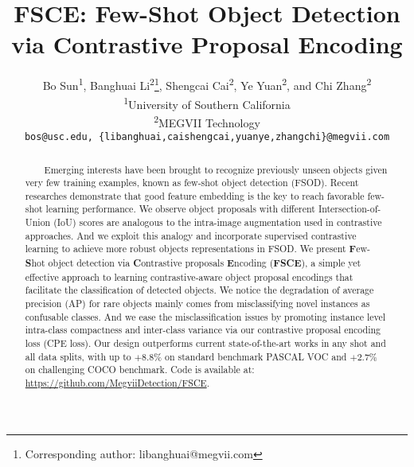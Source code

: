 \documentclass[final]{cvpr}
\newcommand*{\affaddr}[1]{#1} \newcommand*{\affmark}[1][*]{\textsuperscript{#1}}
\newcommand*{\email}[1]{\texttt{#1}}
\begin{document}
\title{FSCE: Few-Shot Object Detection via Contrastive Proposal Encoding}

\author{Bo Sun\affmark[1], Banghuai Li\affmark[2]\thanks{Corresponding author: libanghuai@megvii.com}, Shengcai Cai\affmark[2], Ye Yuan\affmark[2], and Chi Zhang\affmark[2]\\
\affaddr{\affmark[1]University of Southern California}\\
\affaddr{\affmark[2]MEGVII Technology}\\
\email{bos@usc.edu, \{libanghuai,caishengcai,yuanye,zhangchi\}@megvii.com}\\
}

\maketitle

\begin{abstract}
\vspace{-2.5mm}
\ \ \ \ Emerging interests have been brought to recognize previously unseen objects given very few training examples, known as few-shot object detection (FSOD). Recent researches demonstrate that good feature embedding is the key to reach favorable few-shot learning performance.  We observe object proposals with different Intersection-of-Union (IoU) scores are analogous to the intra-image augmentation used in contrastive approaches. And we exploit this analogy and incorporate supervised contrastive learning to achieve more robust objects representations in FSOD. We present \textbf{F}ew-\textbf{S}hot object detection via \textbf{C}ontrastive proposals \textbf{E}ncoding (\textbf{FSCE}), a simple yet effective approach to learning contrastive-aware object proposal encodings that facilitate the classification of detected objects. We notice the degradation of average precision (AP) for rare objects mainly comes from misclassifying novel instances as confusable classes. And we ease the misclassification issues by promoting instance level intra-class compactness and inter-class variance via our contrastive proposal encoding loss (CPE loss). Our design outperforms current state-of-the-art works in any shot and all data splits, with up to $+8.8\%$ on standard benchmark PASCAL VOC and $+2.7\%$ on challenging COCO benchmark. Code is available at: \url{https://github.com/MegviiDetection/FSCE}.
\end{abstract}
\end{document}
